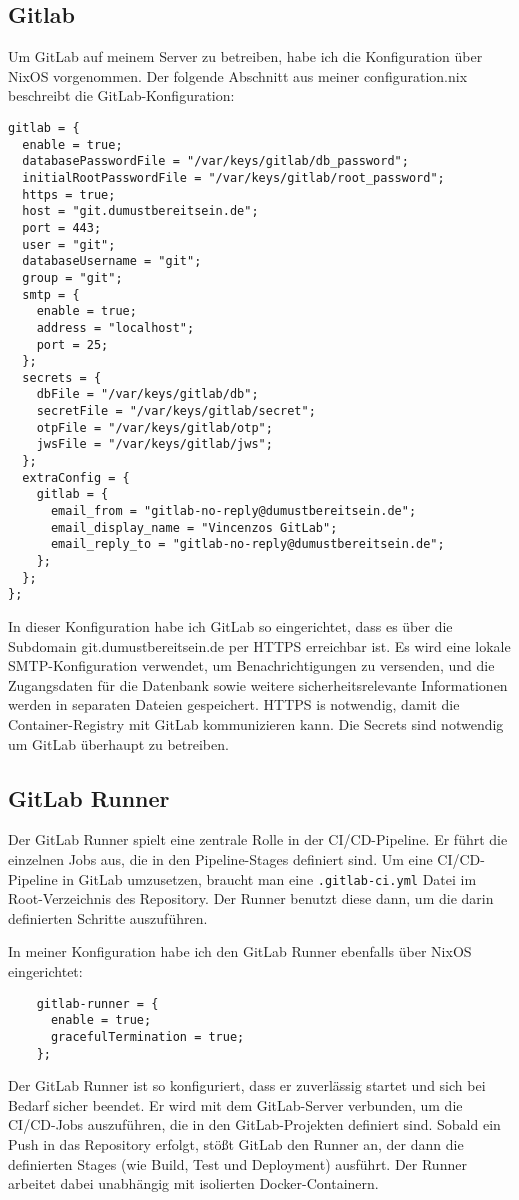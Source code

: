 \subsection{Gitlab} 
Um GitLab auf meinem Server zu betreiben, habe ich die Konfiguration über NixOS vorgenommen. Der folgende Abschnitt aus meiner configuration.nix beschreibt die GitLab-Konfiguration:
\begin{verbatim}
gitlab = {
  enable = true;
  databasePasswordFile = "/var/keys/gitlab/db_password";
  initialRootPasswordFile = "/var/keys/gitlab/root_password";
  https = true;
  host = "git.dumustbereitsein.de";
  port = 443;
  user = "git";
  databaseUsername = "git";
  group = "git";
  smtp = {
    enable = true;
    address = "localhost";
    port = 25;
  };
  secrets = {
    dbFile = "/var/keys/gitlab/db";
    secretFile = "/var/keys/gitlab/secret";
    otpFile = "/var/keys/gitlab/otp";
    jwsFile = "/var/keys/gitlab/jws";
  };
  extraConfig = {
    gitlab = {
      email_from = "gitlab-no-reply@dumustbereitsein.de";
      email_display_name = "Vincenzos GitLab";
      email_reply_to = "gitlab-no-reply@dumustbereitsein.de";
    };
  };
};
\end{verbatim}

In dieser Konfiguration habe ich GitLab so eingerichtet, dass es über die Subdomain git.dumustbereitsein.de per HTTPS erreichbar ist. Es wird eine lokale SMTP-Konfiguration verwendet, um Benachrichtigungen zu versenden, und die Zugangsdaten für die Datenbank sowie weitere sicherheitsrelevante Informationen werden in separaten Dateien gespeichert. HTTPS is notwendig, damit die Container-Registry mit GitLab kommunizieren kann. Die Secrets sind notwendig um GitLab überhaupt zu betreiben. 


\subsection{GitLab Runner}
Der GitLab Runner spielt eine zentrale Rolle in der CI/CD-Pipeline. Er führt die einzelnen Jobs aus, die in den Pipeline-Stages definiert sind. Um eine CI/CD-Pipeline in GitLab umzusetzen, braucht man eine \texttt{.gitlab-ci.yml} Datei im Root-Verzeichnis des Repository. Der Runner benutzt diese dann, um die darin definierten Schritte auszuführen. 

In meiner Konfiguration habe ich den GitLab Runner ebenfalls über NixOS eingerichtet:

\begin{verbatim}
    gitlab-runner = {
      enable = true;
      gracefulTermination = true;
    };
\end{verbatim}
Der GitLab Runner ist so konfiguriert, dass er zuverlässig startet und sich bei Bedarf sicher beendet. Er wird mit dem GitLab-Server verbunden, um die CI/CD-Jobs auszuführen, die in den GitLab-Projekten definiert sind. Sobald ein Push in das Repository erfolgt, stößt GitLab den Runner an, der dann die definierten Stages (wie Build, Test und Deployment) ausführt. Der Runner arbeitet dabei unabhängig mit isolierten Docker-Containern.

